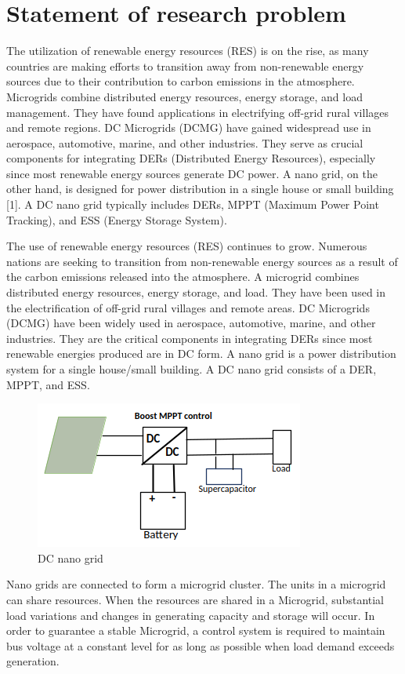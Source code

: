 \section{Statement of research problem}
The utilization of renewable energy resources (RES) is on the rise, as many countries are making efforts to transition away from non-renewable energy sources due to their contribution to carbon emissions in the atmosphere. Microgrids combine distributed energy resources, energy storage, and load management. They have found applications in electrifying off-grid rural villages and remote regions. DC Microgrids (DCMG) have gained widespread use in aerospace, automotive, marine, and other industries. They serve as crucial components for integrating DERs (Distributed Energy Resources), especially since most renewable energy sources generate DC power. A nano grid, on the other hand, is designed for power distribution in a single house or small building [1]. A DC nano grid typically includes DERs, MPPT (Maximum Power Point Tracking), and ESS (Energy Storage System).\par
The use of renewable energy resources (RES) continues to grow. Numerous nations are seeking to transition from non-renewable energy sources as a result of the carbon emissions released into the atmosphere. A microgrid combines distributed energy resources, energy storage, and load. They have been used in the electrification of off-grid rural villages and remote areas. DC Microgrids (DCMG) have been widely used in aerospace, automotive, marine, and other industries. They are the critical components in integrating DERs since most renewable energies produced are in DC form. A nano grid is a power distribution system for a single house/small building. A DC nano grid consists of a DER, MPPT, and ESS.\par

\begin{figure}[H]
	\centering
	\includegraphics[totalheight=6cm]{Figures/dc nano grid.png}
	\caption{DC nano grid}
\end{figure}
Nano grids are connected to form a microgrid cluster. The units in a microgrid can share resources. When the resources are shared in a Microgrid, substantial load variations and changes in generating capacity and storage will occur. In order to guarantee a stable Microgrid, a control system is required to maintain bus voltage at a constant level for as long as possible when load demand exceeds generation.\\\relax

